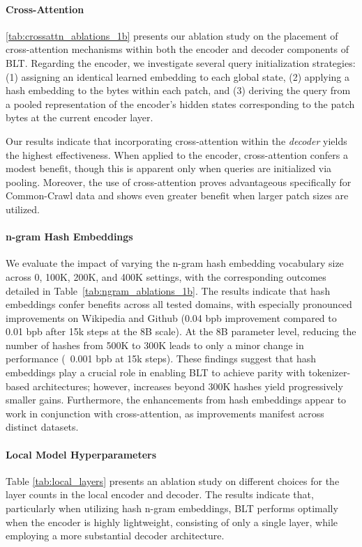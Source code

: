 \paragraph{Cross-Attention}
\autoref{tab:crossattn_ablations_1b} presents our ablation study on the placement of cross-attention mechanisms within both the encoder and decoder components of {\textsc BLT}. Regarding the encoder, we investigate several query initialization strategies: (1) assigning an identical learned embedding to each global state, (2) applying a hash embedding to the bytes within each patch, and (3) deriving the query from a pooled representation of the encoder's hidden states corresponding to the patch bytes at the current encoder layer.

Our results indicate that incorporating cross-attention within the \textit{decoder} yields the highest effectiveness. When applied to the encoder, cross-attention confers a modest benefit, though this is apparent only when queries are initialized via pooling. Moreover, the use of cross-attention proves advantageous specifically for Common-Crawl data and shows even greater benefit when larger patch sizes are utilized.

\paragraph{n-gram Hash Embeddings} 

We evaluate the impact of varying the n-gram hash embedding vocabulary size across 0, 100K, 200K, and 400K settings, with the corresponding outcomes detailed in Table~\ref{tab:ngram_ablations_1b}. The results indicate that hash embeddings confer benefits across all tested domains, with especially pronounced improvements on Wikipedia and Github (0.04 bpb improvement compared to 0.01 bpb after 15k steps at the 8B scale). At the 8B parameter level, reducing the number of hashes from 500K to 300K leads to only a minor change in performance (~0.001 bpb at 15k steps). These findings suggest that hash embeddings play a crucial role in enabling {\textsc BLT} to achieve parity with tokenizer-based architectures; however, increases beyond 300K hashes yield progressively smaller gains. Furthermore, the enhancements from hash embeddings appear to work in conjunction with cross-attention, as improvements manifest across distinct datasets.

\paragraph{Local Model Hyperparameters} Table \ref{tab:local_layers} presents an ablation study on different choices for the layer counts in the local encoder and decoder. The results indicate that, particularly when utilizing hash n-gram embeddings, {\textsc BLT} performs optimally when the encoder is highly lightweight, consisting of only a single layer, while employing a more substantial decoder architecture.

